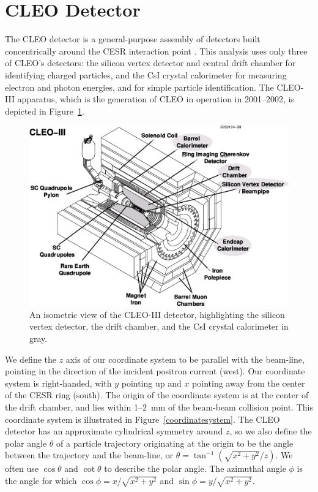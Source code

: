 \documentclass{cornell}
\begin{document}
\section{CLEO Detector}

The CLEO detector is a general-purpose assembly of detectors built
concentrically around the CESR interaction point \cite{cleoiii}
\cite{driii}.  This analysis uses only three of CLEO's detectors: the
silicon vertex detector and central drift chamber for identifying
charged particles, and the CsI crystal calorimeter for measuring
electron and photon energies, and for simple particle identification.
The CLEO-III apparatus, which is the generation of CLEO in operation
in 2001--2002, is depicted in Figure~\ref{cleoiii}.

\begin{figure}
  \begin{center}
    \includegraphics[width=0.75\linewidth]{cleoiii}
  \end{center}
  \caption[Isometric view of the CLEO-III detector]{\label{cleoiii} An
  isometric view of the CLEO-III detector, highlighting the silicon
  vertex detector, the drift chamber, and the CsI crystal calorimeter
  in gray.}
\end{figure}

We define the $z$ axis of our coordinate system to be parallel with
the beam-line, pointing in the direction of the incident positron
current (west).  Our coordinate system is right-handed, with $y$
pointing up and $x$ pointing away from the center of the CESR ring
(south).  The origin of the coordinate system is at the center of the
drift chamber, and lies within 1--2~mm of the beam-beam collision
point.  This coordinate system is illustrated in
Figure~\ref{coordinatesystem}.  The CLEO detector has an approximate
cylindrical symmetry around $z$, so we also define the polar angle
$\theta$ of a particle trajectory originating at the origin to be the
angle between the trajectory and the beam-line, or $\theta =
\tan^{-1}\left(\sqrt{x^2+y^2}/z\right)$.  We often use $\cos\theta$
and $\cot\theta$ to describe the polar angle.  The azimuthal angle
$\phi$ is the angle for which $\cos \phi = x/\sqrt{x^2+y^2}$ and $\sin
\phi = y/\sqrt{x^2+y^2}$.
\end{document}
